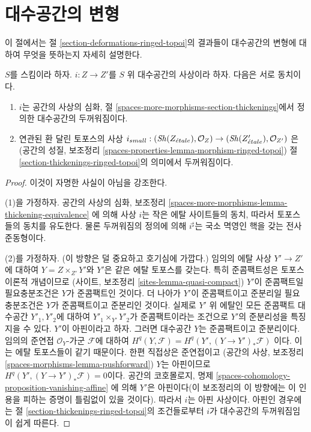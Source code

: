 \section{대수공간의 변형}
\label{section-deformations-spaces}

\noindent
이 절에서는 절 \ref{section-deformations-ringed-topoi}의 결과들이
대수공간의 변형에 대하여 무엇을 뜻하는지 자세히 설명한다.

\begin{lemma}
\label{lemma-match-thickenings}
$S$를 스킴이라 하자. $i : Z \to Z'$를 $S$ 위 대수공간의 사상이라
하자. 다음은 서로 동치이다.
\begin{enumerate}
\item $i$는 공간의 사상의 심화, 절
\ref{spaces-more-morphisms-section-thickenings}에서 정의한 대수공간의
두꺼워짐이다.
\item 연관된 환 달린 토포스의 사상
$i_{small} : (\mathop{\mathit{Sh}}\nolimits(Z_{\acute{e}tale}), \mathcal{O}_Z) \to
(\mathop{\mathit{Sh}}\nolimits(Z'_{\acute{e}tale}), \mathcal{O}_{Z'})$
은(공간의 성질, 보조정리
\ref{spaces-properties-lemma-morphism-ringed-topoi})
절 \ref{section-thickenings-ringed-topoi}의 의미에서 두꺼워짐이다.
\end{enumerate}
\end{lemma}

\begin{proof}
이것이 자명한 사실이 아님을 강조한다.

\medskip\noindent
(1)을 가정하자. 공간의 사상의 심화, 보조정리
\ref{spaces-more-morphisms-lemma-thickening-equivalence}
에 의해 사상 $i$는 작은 에탈 사이트들의 동치, 따라서 토포스들의
동치를 유도한다. 물론 두꺼워짐의 정의에 의해 $i^\sharp$는 국소
멱영인 핵을 갖는 전사 준동형이다.

\medskip\noindent
(2)를 가정하자. (이 방향은 덜 중요하고 호기심에 가깝다.) 임의의 에탈
사상 $Y' \to Z'$에 대하여 $Y = Z \times_{Z'} Y'$와 $Y'$은 같은 에탈
토포스를 갖는다. 특히 준콤팩트성은 토포스 이론적 개념이므로
(사이트, 보조정리 \ref{sites-lemma-quasi-compact}) $Y'$이 준콤팩트일
필요충분조건은 $Y$가 준콤팩트인 것이다. 더 나아가 $Y'$이 준콤팩트이고
준분리일 필요충분조건은 $Y$가 준콤팩트이고 준분리인 것이다. 실제로
$Y'$ 위 에탈인 모든 준콤팩트 대수공간 $Y'_1, Y'_2$에 대하여
$Y'_1 \times_{Y'} Y'_2$가 준콤팩트이라는 조건으로 $Y'$의 준분리성을
특징지을 수 있다. $Y'$이 아핀이라고 하자. 그러면 대수공간 $Y$는
준콤팩트이고 준분리이다. 임의의 준연접 $\mathcal{O}_Y$-가군
$\mathcal{F}$에 대하여
$H^q(Y, \mathcal{F}) = H^q(Y', (Y \to Y')_*\mathcal{F})$
이다. 이는 에탈 토포스들이 같기 때문이다. 한편 직접상은 준연접이고
(공간의 사상, 보조정리 \ref{spaces-morphisms-lemma-pushforward})
$Y$는 아핀이므로 $H^q(Y', (Y \to Y')_*\mathcal{F}) = 0$이다.
공간의 코호몰로지, 명제
\ref{spaces-cohomology-proposition-vanishing-affine}
에 의해 $Y'$은 아핀이다(이 보조정리의 이 방향에는 이 인용을 피하는
증명이 틀림없이 있을 것이다). 따라서 $i$는 아핀 사상이다. 아핀인
경우에는 절 \ref{section-thickenings-ringed-topoi}의 조건들로부터
$i$가 대수공간의 두꺼워짐임이 쉽게 따른다.
\end{proof}

